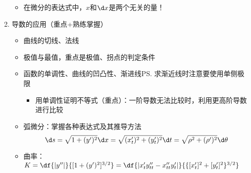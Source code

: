 \begin{enumerate}
\begin{itemize}
    \item 在微分的表达式中，$x$和$\d x$是两个无关的量！
  \end{itemize}
  \item 导数的应用（重点+熟练掌握）
  \begin{itemize}
    \item 曲线的切线、法线
    \item 极值与最值，重点是极值、拐点的判定条件
    \item 函数的单调性、曲线的凹凸性、渐进线\ps{求渐近线时注意要使用单侧极限}
    \begin{itemize}
      \item 用单调性证明不等式（重点）：一阶导数无法比较时，利用更高阶导数进行比较
    \end{itemize} 
	\item 弧微分：掌握各种表达式及其推导方法
	$$\d s=\sqrt{1+(y')^2}\d x=\sqrt{(x'_t)^2+(y'_t)^2}\d t
	=\sqrt{\rho^2+(\rho')^2}\d\theta$$
    \item 曲率：$K=\df{|y''|}{[1+(y')^2]^{3/2}}=
    \df{|x'_ty''_{tt}-x''_{tt}y'_t|}
	{\{[x'_t]^2+[y'_t]^2\}^{3/2}}$
  \end{itemize}
\end{enumerate}

\bigskip

